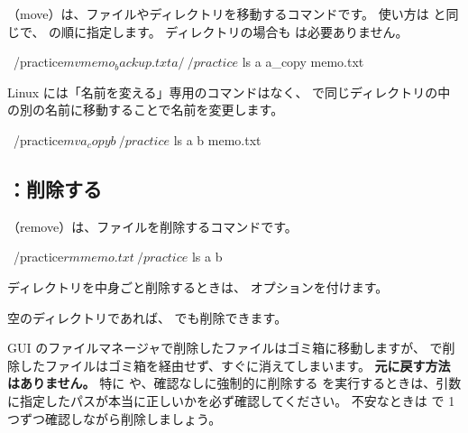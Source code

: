 （move）は、ファイルやディレクトリを移動するコマンドです。
使い方は  と同じで、 の順に指定します。
ディレクトリの場合も  は必要ありません。

\begin{terminal}[ファイルを移動する]
~/practice$ mv memo_backup.txt a/
~/practice$ ls
a  a_copy  memo.txt
\end{terminal}

Linux には「名前を変える」専用のコマンドはなく、 で同じディレクトリの中の別の名前に移動することで名前を変更します。

\begin{terminal}[名前を変える]
~/practice$ mv a_copy b
~/practice$ ls
a  b  memo.txt
\end{terminal}


\subsection{：削除する}

（remove）は、ファイルを削除するコマンドです。

\begin{terminal}[ファイルを削除する]
~/practice$ rm memo.txt
~/practice$ ls
a  b
\end{terminal}

ディレクトリを中身ごと削除するときは、 オプションを付けます。


空のディレクトリであれば、 でも削除できます。

\begin{caution}[rm で消したファイルは元に戻せない]
  GUI のファイルマネージャで削除したファイルはゴミ箱に移動しますが、 で削除したファイルはゴミ箱を経由せず、すぐに消えてしまいます。
  \textbf{元に戻す方法はありません。}
  特に  や、確認なしに強制的に削除する  を実行するときは、引数に指定したパスが本当に正しいかを必ず確認してください。
  不安なときは  で 1 つずつ確認しながら削除しましょう。
\end{caution}

